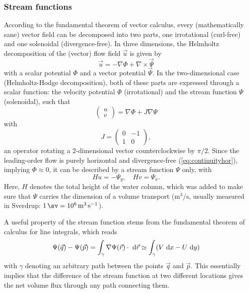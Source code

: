 \subsubsection{Stream functions}
According to the fundamental theorem of vector calculus, every (mathematically sane) vector field can be decomposed into two parts, one irrotational (curl-free) and one solenoidal (divergence-free). In three dimensions, the Helmholtz decomposition of the (vector) flow field \(\vec{u}\) is given by
%
\begin{equation}
\vec{u} = - \nabla \Phi + \nabla \times \vec{\Psi}
\end{equation}
%
with a scalar potential \(\Phi\) and a vector potential \(\vec{\Psi}\). In the two-dimensional case (Helmholtz-Hodge decomposition), both of these parts are expressed through a scalar function: the velocity potential \(\Phi\) (irrotational) and the stream function \(\Psi\) (solenoidal), such that
% 
\begin{equation}
\begin{pmatrix} u \\ v \end{pmatrix} = \nabla \Phi + J \nabla \Psi
\end{equation}
%
with
%
\begin{equation}
J = \begin{pmatrix} 0 & -1 \\ 1 & 0 \end{pmatrix},
\end{equation}
%
an operator rotating a 2-dimensional vector counterclockwise by \(\pi/2\). 
Since the leading-order flow is purely horizontal and divergence-free (\cf \eqref{eq:continuityhor}), implying \(\Phi \approx 0\), it can be described by a stream function \(\Psi\) only, with
%
\begin{equation}
Hu = - \Psi_y, \quad Hv = \Psi_x. \label{eq:streamfunc}
\end{equation}
%
Here, \(H\) denotes the total height of the water column, which was added to make sure that \(\Psi\) carries the dimension of a volume transport (\(\si{\cubic\metre\per\second}\), usually measured in Sverdrup: \(\SI{1}{\sv} = \SI{e6}{\cubic\metre\per\second}\)).

A useful property of the stream function stems from the fundamental theorem of calculus for line integrals, which reads
%
\begin{equation}
\Psi(\vec{q}) - \Psi(\vec{p}) = \int_{\gamma} \nabla \Psi(\vec{r})\cdot~\text{d}\vec{r} \simeq \int_{\gamma} (V ~\text{d}x - U ~\text{d}y)
\end{equation}
%
with \(\gamma\) denoting an arbitrary path between the points \(\vec{q}\) and \(\vec{p}\). This essentially implies that the difference of the stream function at two different locations gives the net volume flux through any path connecting them. 

